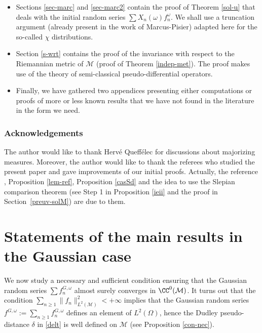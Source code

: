 \begin{itemize}
\item Sections \ref{sec-marc} and \ref{sec-marc2} contain the proof of Theorem \ref{sol-u} that deals with the initial random series $\sum X_n(\omega)f_n^\omega$.
We shall use a truncation argument (already present in the work of Marcus-Pisier) adapted here for the so-called $\chi$ distributions.
\item Section \ref{s-wrt} contains the proof of the invariance with respect to the Riemannian metric of $\mathcal{M}$ (proof of Theorem \ref{indep-met}). The proof makes use of the theory of semi-classical pseudo-differential operators.
\item Finally, we have gathered two appendices presenting either computations or proofs of more or less known results that we have not found in the literature in the form we need.
\end{itemize}

\subsubsection*{Acknowledgements} The author would like to thank Hervé Queffélec for discussions about majorizing measures.
Moreover, the author would like to thank the referees who studied the present paper and gave improvements of our initial proofs.
Actually, the reference \cite[Th.\,2.7.4, p.\,61]{dudley2014}, Proposition \ref{lem-ref}, Proposition \ref{casSd} and the idea to use the Slepian comparison theorem (see
Step 1 in Proposition \ref{ieii} and the proof in Section~\ref{preuv-solM}) are due to them.

\section{Statements of the main results in the Gaussian case}\label{result}

We now study a necessary and sufficient condition ensuring that the Gaussian random series $\sum f_n^{G,\omega}$ almost surely converges in $\CC^0(\mathcal{M})$.
It turns out that the condition $\sum_{n\geq 1} \|f_n\|_{L^2(\mathcal{M})}^2<+\infty$ implies that the Gaussian random series $f^{G,\omega}:=\sum_{n\geq 1} f_n^{G,\omega}$ defines an element of $L^2(\Omega)$, hence the Dudley pseudo-distance $\delta$ in \eqref{delt} is well defined on $\mathcal{M}$ (see Proposition \ref{con-nec}).


